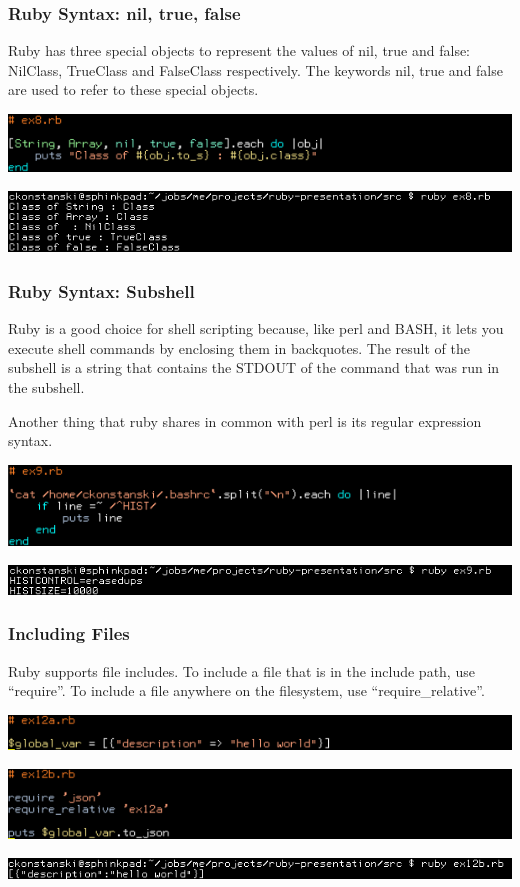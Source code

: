 \documentclass[helvetica,english,utf8,notitle,nologo]{beamer}
\begin{document}
\begin{frame}
  \frametitle{Ruby Syntax: nil, true, false}

  Ruby has three special objects to represent the values of nil, true
  and false: NilClass, TrueClass and FalseClass respectively. The
  keywords nil, true and false are used to refer to these special
  objects.

  \includegraphics[scale=0.53]{src_8}

  \includegraphics[scale=0.5]{out_8}
\end{frame}

\begin{frame}
  \frametitle{Ruby Syntax: Subshell}

  Ruby is a good choice for shell scripting because, like perl and
  BASH, it lets you execute shell commands by enclosing them in
  backquotes. The result of the subshell is a string that contains the
  STDOUT of the command that was run in the subshell.

  Another thing that ruby shares in common with perl is its regular
  expression syntax.
  
  \includegraphics[scale=0.53]{src_9}

  \includegraphics[scale=0.5]{out_9}
\end{frame}

\begin{frame}
  \frametitle{Including Files}

  Ruby supports file includes. To include a file that is in the
  include path, use ``require''. To include a file anywhere on the
  filesystem, use ``require\_relative''.

  \includegraphics[scale=0.53]{src_12a}

  \includegraphics[scale=0.53]{src_12b}

  \includegraphics[scale=0.5]{out_12}
\end{frame}
\end{document}
